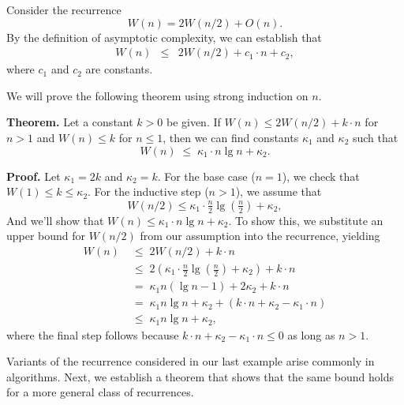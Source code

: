 \begin{example}
Consider the recurrence
$$
W(n) = 2W(n/2) + O(n).
$$
%
%
By the definition of asymptotic complexity, we
can establish that
\begin{eqnarray*}
  W(n) &\leq& 2W(n/2) + c_1\cdot n + c_2,
\end{eqnarray*}
where $c_1$ and $c_2$ are constants.  



We will prove the following theorem using strong induction on $n$.


\textbf{Theorem.}
  Let a constant $k > 0$ be given.  If $W(n) \leq 2 W(n/2) + k \cdot n$ for $n >
  1$ and $W(n) \leq k$ for $n \leq 1$, then we can find constants $\kappa_1$ and
  $\kappa_2$ such that \[ W(n) \;\leq\; \kappa_1 \cdot n \lg n + \kappa_2.\]

\textbf{Proof.}
  Let $\kappa_1 = 2k$ and $\kappa_2 = k$.  For the base case ($n=1$), we check
  that $W(1) \leq k \leq \kappa_2$.  For the inductive step ($n>1$), we assume that
  \[
  W(n/2) \leq \kappa_1 \cdot \tfrac{n}2 \lg (\tfrac{n}2) + \kappa_2,
  \]
  And we'll show that $W(n) \leq \kappa_1 \cdot n \lg n + \kappa_2$.  To show
  this, we substitute an upper bound for $W(n/2)$ from our assumption into the
  recurrence, yielding
  \begin{align*}
    W(n) \;&\leq\; 2W(n/2) + k \cdot n  \\
    \;&\leq\; 2(\kappa_1 \cdot \tfrac{n}2 \lg (\tfrac{n}2) + \kappa_2) + k \cdot n\\
    \;&=\; \kappa_1 n (\lg n - 1) + 2 \kappa_2 + k \cdot n\\
    \;&=\; \kappa_1 n \lg n + \kappa_2 + (k \cdot n + \kappa_2 - \kappa_1 \cdot n)\\
    \;&\leq\; \kappa_1 n \lg n + \kappa_2,
  \end{align*}
  where the final step follows because $k \cdot n + \kappa_2 - \kappa_1 \cdot n \leq
  0$ as long as $n > 1$.

\end{example}

\begin{gram}
Variants of the recurrence considered in our last example arise
commonly in algorithms.  Next, we establish a theorem that shows that
the same bound holds for a more general class of recurrences. 
\end{gram}

